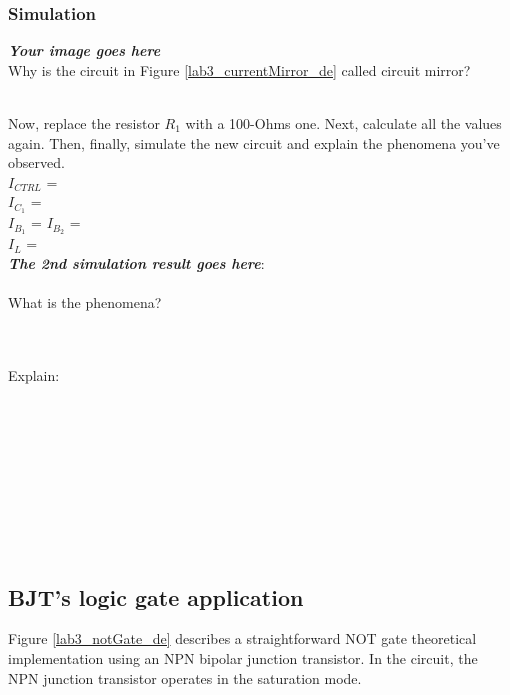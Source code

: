 \subsubsection{Simulation}
\textbf{\textit{Your image goes here}}
\vspace{8cm}
\\
Why is the circuit in Figure \ref{lab3_currentMirror_de} called circuit mirror?
\dotfill\bigskip\par\mbox{}\dotfill\bigskip\\
Now, replace the resistor $R_1$ with a 100-Ohms one. Next, calculate all the values again. Then, finally, simulate the new circuit and explain the phenomena you've observed.\bigskip\\
$I_{CTRL}$ = \dotfill \bigskip \\
$I_{C_1}$ = \dotfill \bigskip \\
$I_{B_1}$ = $I_{B_2}$ = \dotfill \bigskip \\
$I_L$ = \dotfill \bigskip \\
\newpage
\textbf{\textit{The 2nd simulation result goes here}}:\\
\vspace{8cm}
\\
What is the phenomena? \bigskip\\
\dotfill\bigskip\par\mbox{}\dotfill\bigskip\\
\\
Explain:
\begin{center}
    \dotfill\bigskip\par\mbox{}\dotfill\bigskip\\
    \dotfill\bigskip\par\mbox{}\dotfill\bigskip\\
    \dotfill\bigskip\par\mbox{}\dotfill\bigskip\\
    \dotfill\bigskip\par\mbox{}\dotfill\bigskip\\
    \dotfill\bigskip\par\mbox{}\dotfill\bigskip\\
\end{center}

\subsection{BJT's logic gate application}
Figure \ref{lab3_notGate_de} describes a straightforward NOT gate theoretical implementation using an NPN bipolar junction transistor. In the circuit, the NPN junction transistor operates in the saturation mode.


